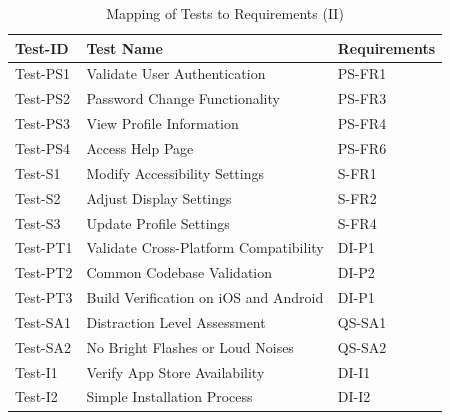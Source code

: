 \documentclass[12pt, titlepage]{article}
\begin{document}
\begin{table}[htpb!]
  \centering
  \begin{tabular}{|l|p{8cm}|p{3cm}|}
    \hline
    \textbf{Test-ID} & \textbf{Test Name}                    & \textbf{Requirements} \\
    \hline
    Test-PS1         & Validate User Authentication          & PS-FR1                \\
    \hline
    Test-PS2         & Password Change Functionality         & PS-FR3                \\
    \hline
    Test-PS3         & View Profile Information              & PS-FR4                \\
    \hline
    Test-PS4         & Access Help Page                      & PS-FR6                \\
    \hline
    Test-S1          & Modify Accessibility Settings         & S-FR1                 \\
    \hline
    Test-S2          & Adjust Display Settings               & S-FR2                 \\
    \hline
    Test-S3          & Update Profile Settings               & S-FR4                 \\
    \hline
    Test-PT1         & Validate Cross-Platform Compatibility & DI-P1                 \\
    \hline
    Test-PT2         & Common Codebase Validation            & DI-P2                 \\
    \hline
    Test-PT3         & Build Verification on iOS and Android & DI-P1                 \\
    \hline
    Test-SA1         & Distraction Level Assessment          & QS-SA1                \\
    \hline
    Test-SA2         & No Bright Flashes or Loud Noises      & QS-SA2                \\
    \hline
    Test-I1          & Verify App Store Availability         & DI-I1                 \\
    \hline
    Test-I2          & Simple Installation Process           & DI-I2                 \\
    \hline
  \end{tabular}
  \caption{Mapping of Tests to Requirements (II)}
  \label{tab:test_requirements2}
\end{table}
\end{document}
